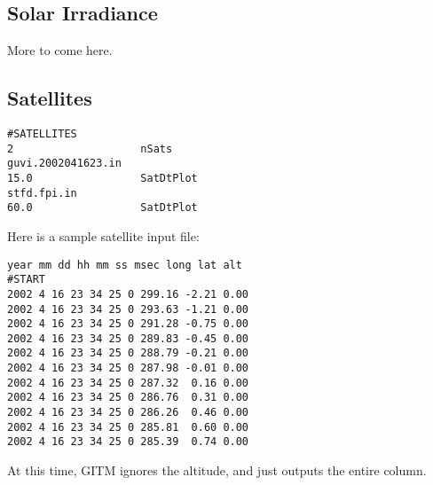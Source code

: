\subsection{Solar Irradiance}


More to come here.

\subsection{Satellites}


\begin{verbatim}
#SATELLITES 
2                    nSats 
guvi.2002041623.in 
15.0                 SatDtPlot 
stfd.fpi.in 
60.0                 SatDtPlot

\end{verbatim}

Here is a sample satellite input file:

\begin{verbatim}
year mm dd hh mm ss msec long lat alt
#START
2002 4 16 23 34 25 0 299.16 -2.21 0.00 
2002 4 16 23 34 25 0 293.63 -1.21 0.00 
2002 4 16 23 34 25 0 291.28 -0.75 0.00 
2002 4 16 23 34 25 0 289.83 -0.45 0.00 
2002 4 16 23 34 25 0 288.79 -0.21 0.00 
2002 4 16 23 34 25 0 287.98 -0.01 0.00 
2002 4 16 23 34 25 0 287.32  0.16 0.00 
2002 4 16 23 34 25 0 286.76  0.31 0.00 
2002 4 16 23 34 25 0 286.26  0.46 0.00 
2002 4 16 23 34 25 0 285.81  0.60 0.00 
2002 4 16 23 34 25 0 285.39  0.74 0.00
\end{verbatim}

At this time, GITM ignores the altitude, and just outputs the entire column.

